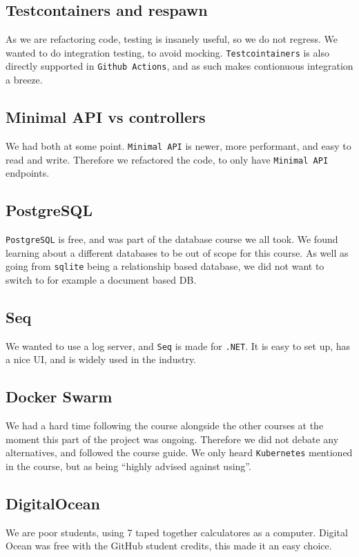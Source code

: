 \subsection{Testcontainers and respawn}
As we are refactoring code, testing is insanely 
useful, so we do not regress. 
We wanted to do integration testing, to avoid mocking. 
\texttt{Testcointainers} is also directly supported in \texttt{Github Actions}, 
and as such makes contionuous integration a breeze.

\subsection{Minimal API vs controllers}
We had both at some point. \texttt{Minimal API} is newer, more performant, 
and easy to read and write. 
Therefore we refactored the code, to only have \texttt{Minimal API} endpoints.

\subsection{PostgreSQL}
\texttt{PostgreSQL} is free, and was part of the database course we all
took. 
We found learning about a different databases to be 
out of scope for this course. 
As well as going from \texttt{sqlite}
being a relationship based database, we did not want to 
switch to for example a document based DB.

\subsection{Seq}
We wanted to use a log server, and \texttt{Seq} is made for \texttt{.NET}.
It is easy to set up, has a nice UI, and is widely used 
in the industry.

\subsection{Docker Swarm}
We had a hard time following the course alongside the other 
courses at the moment this part of the project was ongoing.
Therefore we did not debate any alternatives, and followed 
the course guide. 
We only heard \texttt{Kubernetes} mentioned in 
the course, but as being ``highly advised against using''.

\subsection{DigitalOcean}
We are poor students, using 7 taped together calculatores 
as a computer. 
Digital Ocean was free with the GitHub student 
credits, this made it an easy choice.
